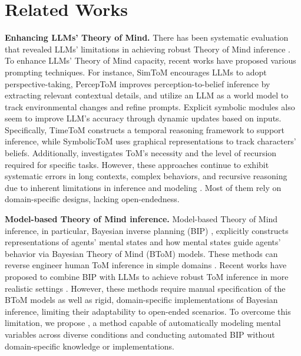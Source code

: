 \section{Related Works}

\textbf{Enhancing LLMs' Theory of Mind.} There has been systematic evaluation that revealed LLMs' limitations in achieving robust Theory of Mind inference \citep{ullman2023large, shapira2023clever}. To enhance LLMs' Theory of Mind capacity, recent works have proposed various prompting techniques. For instance, SimToM \citep{wilf2023think} encourages LLMs to adopt perspective-taking, PercepToM \citep{jung2024perceptions} improves perception-to-belief inference by extracting relevant contextual details, and \citet{huang2024notion} utilize an LLM as a world model to track environmental changes and refine prompts. Explicit symbolic modules also seem to improve LLM's accuracy through dynamic updates based on inputs. Specifically, TimeToM \citep{hou2024timetom} constructs a temporal reasoning framework to support inference, while SymbolicToM \citep{sclar2023minding} uses graphical representations to track characters' beliefs. Additionally, \citet{wagner2024mind} investigates ToM's necessity and the level of recursion required for specific tasks. However, these approaches continue to exhibit systematic errors in long contexts, complex behaviors, and recursive reasoning due to inherent limitations in inference and modeling \citep{jin2024mmtom,shi2024muma}. Most of them rely on domain-specific designs, lacking open-endedness.


\textbf{Model-based Theory of Mind inference.} Model-based Theory of Mind inference, in particular, Bayesian inverse planning (BIP) \citep{baker2009action,ullman2009help,baker2017rational,zhi2020online}, explicitly constructs representations of agents' mental states and how mental states guide agents' behavior via Bayesian Theory of Mind (BToM) models. These methods can reverse engineer human ToM inference in simple domains \citep[e.g.,][]{baker2017rational,netanyahu2021phase,shu2021agent}. Recent works have proposed to combine BIP with LLMs to achieve robust ToM inference in more realistic settings \citep{ying2023neuro, jin2024mmtom, shi2024muma}. However, these methods require manual specification of the BToM models as well as rigid, domain-specific implementations of Bayesian inference, limiting their adaptability to open-ended scenarios. To overcome this limitation, we propose \ours, a method capable of automatically modeling mental variables across diverse conditions and conducting automated BIP without domain-specific knowledge or implementations.



